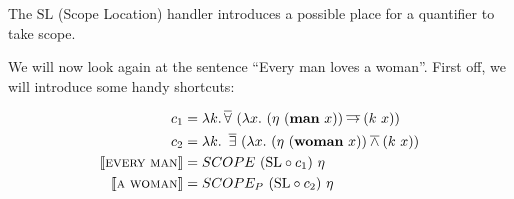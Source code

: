 \documentclass{article}
\newcommand{\abs}[1]{\textsc{#1}}
\newcommand{\obj}[1]{\textbf{#1}}
\newcommand{\sem}[1]{\llbracket #1 \rrbracket}
\newcommand{\dand}{\mathbin{\overline{\land}}}
\newcommand{\dimpl}{\mathbin{\overline{\to}}}
\newcommand{\dexists}{\mathop{\overline{\exists}}}
\newcommand{\dforall}{\mathop{\overline{\forall}}}
\begin{document}
The $\mathrm{SL}$ (Scope Location) handler introduces a possible place for
a quantifier to take scope.

We will now look again at the sentence ``Every man loves a woman''. First
off, we will introduce some handy shortcuts:

\begin{align*}
c_1 &= \lambda k. \dforall\ (\lambda x.\ (\eta\ (\obj{man}\ x)) \dimpl (k\ x)) \\
c_2 &= \lambda k.\ \dexists\ (\lambda x.\ (\eta\ (\obj{woman}\ x)) \dand
(k\ x)) \\
\sem{\abs{every}\ \abs{man}} &= SCOPE\ (\mathrm{SL} \circ c_1)\ \eta \\
\sem{\abs{a}\ \abs{woman}} &= SCOPE_P\ (\mathrm{SL} \circ c_2)\ \eta
\end{align*}
\end{document}
